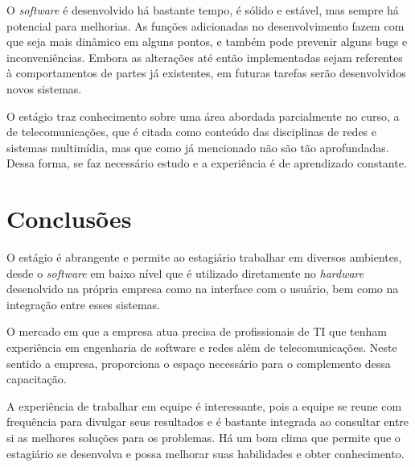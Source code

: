 \documentclass[12pt]{article}
\begin{document}
O \textit{software} é desenvolvido há bastante tempo, é sólido e estável, mas
sempre há potencial para melhorias. As funções adicionadas no desenvolvimento
fazem com que seja mais dinâmico em alguns pontos, e também pode prevenir
alguns bugs e inconveniências. Embora as alterações até então implementadas
sejam referentes à comportamentos de partes já existentes, em futuras tarefas
serão desenvolvidos novos sistemas.

O estágio traz conhecimento sobre uma área abordada parcialmente no curso, a de
telecomunicações, que é citada como conteúdo das disciplinas de redes e
sistemas multimídia, mas que como já mencionado não são tão aprofundadas. Dessa
forma, se faz necessário estudo e a experiência é de aprendizado constante.

\section{Conclusões}

O estágio é abrangente e permite ao estagiário trabalhar em diversos ambientes,
desde o \textit{software} em baixo nível que é utilizado diretamente no
\textit{hardware} desenolvido na própria empresa como na interface com o
usuário, bem como na integração entre esses sistemas.

O mercado em que a empresa atua precisa de profissionais de TI que tenham
experiência em engenharia de software e redes além de telecomunicações. Neste
sentido a empresa, proporciona o espaço necessário para o complemento dessa
capacitação.

A experiência de trabalhar em equipe é interessante, pois a equipe se reune com
frequência para divulgar seus resultados e é bastante integrada ao consultar
entre si as melhores soluções para os problemas. Há um bom clima que permite
que o estagiário se desenvolva e possa melhorar suas habilidades e obter
conhecimento.

%
%
\end{document}
